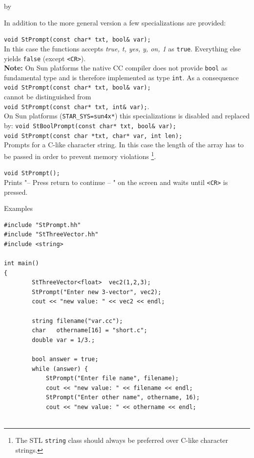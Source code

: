 \documentclass[twoside]{article}
\newcommand{\comp}[1]{\texttt{#1}}%
\newcommand{\entrylabel}[1]{\mbox{\textbf{{#1}}}\hfil}%
\newenvironment{entry}
{\begin{list}{}%
    {\renewcommand{\makelabel}{\entrylabel}%
     \setlength{\labelwidth}{90pt}%
     \setlength{\leftmargin}{\labelwidth}
     \advance\leftmargin by \labelsep%
      }%
    }%
  {\end{list}}
\newcommand{\Entrylabel}[1]%
{\raisebox{0pt}[1ex][0pt]{\makebox[\labelwidth][l]%
    {\parbox[t]{\labelwidth}{\hspace{0pt}\textbf{{#1}}}}}}
\newenvironment{Entry}%
{\renewcommand{\entrylabel}{\Entrylabel}\begin{entry}}%
  {\end{entry}}
\begin{document}
\begin{description}
\begin{Entry}
    In addition to the more general version a few specializations
    are provided:

    \verb+void StPrompt(const char* txt, bool& var);+\\
    In this case the functions accepts \textit{true, t, yes, y, on, 1}
    as \comp{true}. Everything else yields \comp{false}
    (except \verb+<CR>+).\\
    {\bf Note:} On Sun platforms the native CC compiler does not provide \comp{bool}
    as fundamental type and is therefore implemented as type \comp{int}.
    As a consequence \\
    \verb+void StPrompt(const char* txt, bool& var);+\\
    cannot be distinguished from \\
    \verb+void StPrompt(const char* txt, int& var);+.\\
    On Sun platforms (\comp{STAR\_SYS=sun4x*}) this specializations is
    disabled and replaced by:
    \verb+void StBoolPrompt(const char* txt, bool& var);+\\    

    \verb+void StPrompt(const char *txt, char* var, int len);+\\
    Prompts for a C-like character string. In this case the length
    of the array has to be passed in order to prevent memory violations
    \footnote{The STL \comp{string} class should always be preferred
        over C-like character strings.}.
    
    \verb+void StPrompt();+\\
    Prints "-- Press return to continue -- " on the screen and waits
    until \verb+<CR>+ is pressed. 
    
\item[Examples]
{\footnotesize
\begin{verbatim}
#include "StPrompt.hh"
#include "StThreeVector.hh"
#include <string>

int main()
{
        StThreeVector<float>  vec2(1,2,3);
        StPrompt("Enter new 3-vector", vec2);
        cout << "new value: " << vec2 << endl;

        string filename("var.cc");
        char   othername[16] = "short.c";
        double var = 1/3.;
        
        bool answer = true;
        while (answer) {
            StPrompt("Enter file name", filename);
            cout << "new value: " << filename << endl;
            StPrompt("Enter other name", othername, 16);
            cout << "new value: " << othername << endl;


\end{verbatim}}
\end{Entry}
\end{description}
\end{document}
